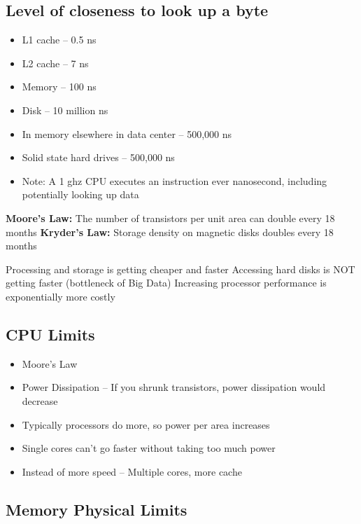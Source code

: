 \documentclass[
]{book}
\providecommand{\tightlist}{%
  \setlength{\itemsep}{0pt}\setlength{\parskip}{0pt}}
\begin{document}
\subsection{Level of closeness to look up a byte}\label{level-of-closeness-to-look-up-a-byte}

\begin{itemize}
\tightlist
\item
  L1 cache -- 0.5 ns
\item
  L2 cache -- 7 ns
\item
  Memory -- 100 ns
\item
  Disk -- 10 million ns
\item
  In memory elsewhere in data center -- 500,000 ns
\item
  Solid state hard drives -- 500,000 ns
\item
  Note: A 1 ghz CPU executes an instruction ever nanosecond, including potentially looking up data
\end{itemize}

\textbf{Moore's Law:} The number of transistors per unit area can double every 18 months
\textbf{Kryder's Law:} Storage density on magnetic disks doubles every 18 months

Processing and storage is getting cheaper and faster
Accessing hard disks is NOT getting faster (bottleneck of Big Data)
Increasing processor performance is exponentially more costly

\subsection{CPU Limits}\label{cpu-limits}

\begin{itemize}
\tightlist
\item
  Moore's Law
\item
  Power Dissipation -- If you shrunk transistors, power dissipation would decrease
\item
  Typically processors do more, so power per area increases
\item
  Single cores can't go faster without taking too much power
\item
  Instead of more speed -- Multiple cores, more cache
\end{itemize}

\subsection{Memory Physical Limits}\label{memory-physical-limits}
\end{document}
